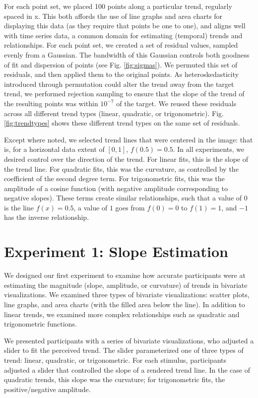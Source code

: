 \documentclass{sigchi}
\begin{document}
For each point set, we placed 100 points along a particular trend, regularly spaced in x. This both affords the use of line graphs and area charts for displaying this data (as they require that points be one to one), and aligns well with time series data, a common domain for estimating (temporal) trends and relationships. For each point set, we created a set of residual values, sampled evenly from a Gaussian. The bandwidth of this Gaussian controls both goodness of fit and dispersion of points (see Fig. \ref{fig:sigmas}). We permuted this set of residuals, and then applied them to the original points. As heteroskedasticity introduced through permutation could alter the trend away from the target trend, we performed rejection sampling to ensure that the slope of the trend of the resulting points was within $10^{-7}$ of the target. We reused these residuals across all different trend types (linear, quadratic, or trigonometric). Fig. \ref{fig:trendtypes} shows these different trend types on the same set of residuals.

Except where noted, we selected trend lines that were centered in the image: that is, for a horizontal data extent of $[0,1]$, $f(0.5) = 0.5$. In all experiments, we desired control over the direction of the trend. For linear fits, this is the slope of the trend line. For quadratic fits, this was the curvature, as controlled by the coefficient of the second degree term. For trigonometric fits, this was the amplitude of a cosine function (with negative amplitude corresponding to negative slopes). These terms create similar relationships, such that a value of $0$ is the line $f(x)=0.5$, a value of $1$ goes from $f(0)=0$ to $f(1)=1$, and $-1$ has the inverse relationship.


\section{Experiment 1: Slope Estimation}

We designed our first experiment to examine how accurate participants were at estimating the magnitude (slope, amplitude, or curvature) of trends in bivariate visualizations. We examined three types of bivariate visualizations: scatter plots, line graphs, and area charts (with the filled area below the line). In addition to linear trends, we examined more complex relationships such as quadratic and trigonometric functions.

We presented participants with a series of bivariate visualizations, who adjusted a slider to fit the perceived trend. The slider parameterized one of three types of trend: linear, quadratic, or trigonometric. For each stimulus, participants adjusted a slider that controlled the slope of a rendered trend line. In the case of quadratic trends, this slope was the curvature; for trigonometric fits, the positive/negative amplitude.
\end{document}
